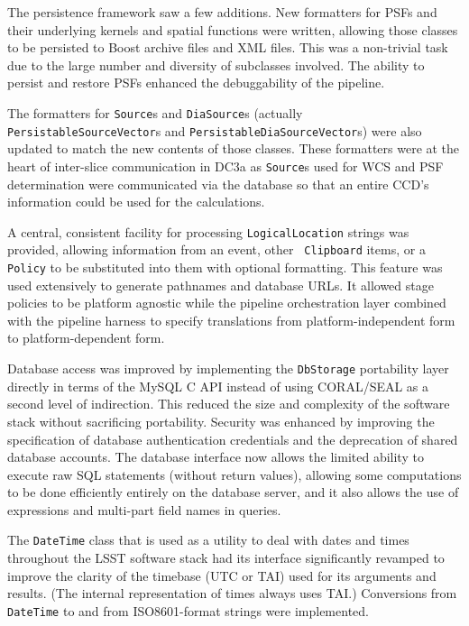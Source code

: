 The persistence framework saw a few additions.  New formatters for PSFs
and their underlying kernels and spatial functions were written,
allowing those classes to be persisted to Boost archive files and XML
files.  This was a non-trivial task due to the large number and
diversity of subclasses involved.  The ability to persist and restore
PSFs enhanced the debuggability of the pipeline.

The formatters for {\tt Source}s and {\tt DiaSource}s (actually {\tt
PersistableSourceVector}s and 
\hfil\break\texttt{PersistableDiaSourceVector}s) were also updated 
to match the new contents of those classes.  These formatters were at
the heart of inter-slice communication in DC3a as {\tt Source}s used
for WCS and PSF determination were communicated via the database so
that an entire CCD's information could be used for the calculations.

A central, consistent facility for processing {\tt LogicalLocation}
strings was provided, allowing information from an event, other {\tt
Clipboard} items, or a {\tt Policy} to be substituted into them with
optional formatting.  This feature was used extensively to generate
pathnames and database URLs.  It allowed stage policies to be
platform agnostic while the pipeline orchestration layer combined
with the pipeline harness to specify translations from
platform-independent form to platform-dependent form.

Database access was improved by implementing the {\tt DbStorage}
portability layer directly in terms of the MySQL C API instead of using
CORAL/SEAL as a second level of indirection.  This reduced the size and
complexity of the software stack without sacrificing portability.
Security was enhanced by improving the specification of database
authentication credentials and the deprecation of shared database
accounts.  The database interface now allows the limited ability to
execute raw SQL statements (without return values), allowing some
computations to be done efficiently entirely on the database server, and
it also allows the use of expressions and multi-part field names in
queries.

The {\tt DateTime} class that is used as a utility to deal with dates and
times throughout the LSST software stack had its interface significantly
revamped to improve the clarity of the timebase (UTC or TAI) used for
its arguments and results.  (The internal representation of times always
uses TAI.)  Conversions from {\tt DateTime} to and from ISO8601-format
strings were implemented.

